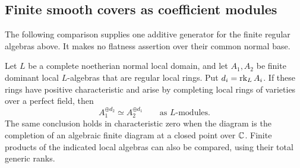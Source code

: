 \subsection{Finite smooth covers as coefficient modules}

The following comparison supplies one additive generator for the finite
regular algebras above.  It makes no flatness assertion over their common
normal base.

\begin{proposition}\label{bc:finite-modules}
Let $L$ be a complete noetherian normal local domain, and let $A_1,A_2$
be finite dominant local $L$-algebras that are regular local rings.
Put $d_i=\operatorname{rk}_L A_i$.
If these rings have positive characteristic and arise by completing local
rings of varieties over a perfect field, then
\begin{equation}\label{bc:regular-comparison}
                 A_1^{\oplus d_2}\simeq A_2^{\oplus d_1}
                 \qquad\text{as $L$-modules}.
\end{equation}
The same conclusion holds in characteristic zero when the diagram is the
completion of an algebraic finite diagram at a closed point over $\mathbb C$.
Finite products of the indicated local algebras can also be compared,
using their total generic ranks.
\end{proposition}

